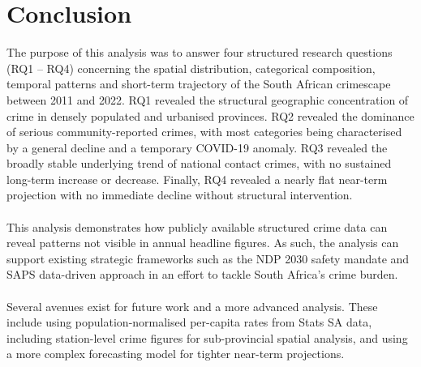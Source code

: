 \documentclass[titlepage, 12pt, oneside]{article}
\numberwithin{equation}{section}
\begin{document}
	\newpage
	\section{Conclusion}
	The purpose of this analysis was to answer four structured research questions (RQ1 -- RQ4) concerning the spatial distribution, categorical composition, temporal patterns and short-term trajectory of the South African crimescape between 2011 and 2022. RQ1 revealed the structural geographic concentration of crime in densely populated and urbanised provinces. RQ2 revealed the dominance of serious community-reported crimes, with most categories being characterised by a general decline and a temporary COVID-19 anomaly. RQ3 revealed the broadly stable underlying trend of national contact crimes, with no sustained long-term increase or decrease. Finally, RQ4 revealed a nearly flat near-term projection with no immediate decline without structural intervention.\\\\
	This analysis demonstrates how publicly available structured crime data can reveal patterns not visible in annual headline figures. As such, the analysis can support existing strategic frameworks such as the NDP 2030 safety mandate and SAPS data-driven approach in an effort to tackle South Africa's crime burden.\\\\
	Several avenues exist for future work and a more advanced analysis. These include using population-normalised per-capita rates from Stats SA data, including station-level crime figures for sub-provincial spatial analysis, and using a more complex forecasting model for tighter near-term projections.  
	
\end{document}
